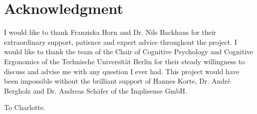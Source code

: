 \section*{Acknowledgment}
  I would like to thank Franziska Horn and Dr. Nils Backhaus for their extraordinary support, patience and expert advice throughout the project. I would like to thank the team of the Chair of Cognitive Psychology and Cognitive Ergonomics of the Technische Universität Berlin for their steady willingness to discuss and advise me with any question I ever had. This project would have been impossible without the brilliant support of Hannes Korte, Dr. André Bergholz and Dr. Andreas Schäfer of the Implisense GmbH.

  \vfill
  \begin{center}
    To Charlotte.
  \end{center}
